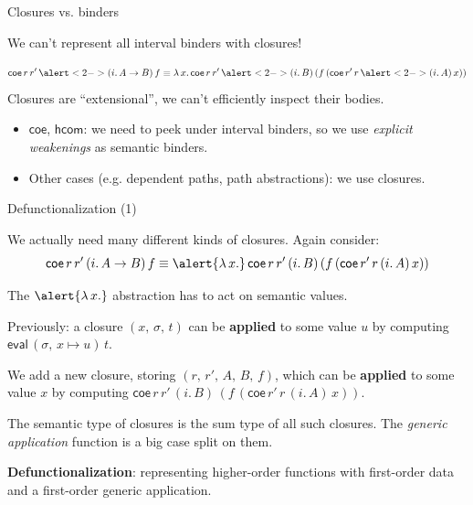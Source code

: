 \documentclass[dvipsnames]{beamer}
\newcommand{\ms}[1]{\mathsf{#1}}
\newcommand{\coe}{\mathsf{coe}}
\newcommand{\eval}{\ms{eval}}
\newcommand{\hcom}{\ms{hcom}}
\begin{document}
\begin{frame}{Closures vs. binders}

We can't represent all interval binders with closures!

\[ \coe\,r\,r'\,\alert<2->{(i.\,A \to B)}\,f \equiv \lambda\,x.\,\coe\,r\,r'\,\alert<2->{(i.\,B)}\,(f\,(\coe\,r'\,r\,\alert<2->{(i.\,A)}\,x)) \]
\pause
\pause
Closures are ``extensional'', we can't efficiently inspect their bodies.
\vspace{0.5em}
\pause

\begin{itemize}
  \item $\coe$, $\hcom$: we need to peek under interval binders, so we use \emph{explicit weakenings} as semantic binders.
  \item Other cases (e.g. dependent paths, path abstractions): we use closures.
\end{itemize}

\end{frame}

\begin{frame}{Defunctionalization (1)}

We actually need many different kinds of closures. Again consider:
\[ \coe\,r\,r'\,(i.\,A \to B)\,f \equiv \alert{\lambda\,x.}\,\coe\,r\,r'\,(i.\,B)\,(f\,(\coe\,r'\,r\,(i.\,A)\,x)) \]

The $\alert{\lambda\,x.}$ abstraction has to act on semantic values.
\vspace{0.8em}
\pause

Previously: a closure $(x,\,\sigma,\,t)$ can be \textbf{applied} to some value $u$ by
computing $\eval\,(\sigma,\,x\mapsto u)\,t$.
\vspace{0.8em}
\pause

We add a new closure, storing $(r,\,r',\,A,\,B,\,f)$, which can be
\textbf{applied} to some value $x$ by computing $\coe\,r\,r'\,(i.\,B)\,(f\,(\coe\,r'\,r\,(i.\,A)\,x))$.
\vspace{0.8em}
\pause

The semantic type of closures is the sum type of all such closures. The \emph{generic application}
function is a big case split on them.
\vspace{0.8em}
\pause

\begin{block}{}\textbf{Defunctionalization}: representing higher-order functions
with first-order data and a first-order generic application.
\end{block}
\end{frame}
\end{document}
